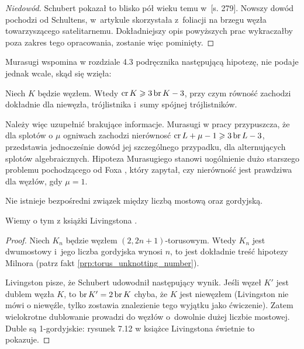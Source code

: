 \begin{proof}[Niedowód]
%
%
    Schubert pokazał to blisko pół wieku temu w~\cite{schubert54}[s. 279].
    Nowszy dowód pochodzi od Schultens, w~artykule \cite{schultens03} skorzystała z~foliacji na brzegu węzła towarzyszącego satelitarnemu.
    Dokładniejszy opis powyższych prac wykraczałby poza zakres tego opracowania, zostanie więc pominięty.
\end{proof}

Murasugi wspomina w rozdziale 4.3 podręcznika \cite{murasugi96} następującą hipotezę, nie podaje jednak wcale, skąd się wzięła:
%

\begin{conjecture}
%
    Niech $K$ będzie węzłem.
    Wtedy $\operatorname{cr} K \geqslant 3 \operatorname{br} K - 3$, przy czym równość zachodzi dokładnie dla niewęzła, trójlistnika i~sumy spójnej trójlistników.
\end{conjecture}

Należy więc uzupełnić brakujące informacje.
Murasugi w pracy \cite{murasugi88} przypuszcza, że dla splotów o $\mu$ ogniwach zachodzi nierównosć $\operatorname{cr} L + \mu - 1 \geqslant 3 \operatorname{br} L - 3$, przedstawia jednocześnie dowód jej szczególnego przypadku, dla alternujących splotów algebraicznych.
%
Hipoteza Murasugiego stanowi uogólnienie dużo starszego problemu pochodzącego od Foxa \cite{fox50}, który zapytał, czy nierówność jest prawdziwa dla węzłów, gdy $\mu = 1$.
%

\begin{proposition}
%
\label{no_relation_bridge_unknotting}%
    Nie istnieje bezpośredni związek między liczbą mostową oraz gordyjską.
\end{proposition}

Wiemy o tym z książki Livingstona \cite[s. 146]{livingston93}.

\begin{proof}
    Niech $K_n$ będzie węzłem $(2, 2n+1)$-torusowym.
    Wtedy $K_n$ jest dwumostowy i~jego liczba gordyjska wynosi $n$, to jest dokładnie treść hipotezy Milnora (patrz fakt \ref{prp:torus_unknotting_number}).

    Livingston pisze, że Schubert udowodnił następujący wynik.
    Jeśli węzeł $K'$ jest dublem węzła $K$, to $\operatorname{br} K' = 2 \operatorname{br} K$ chyba, że $K$ jest niewęzłem (Livingston nie mówi o niewęźle, tylko zostawia znalezienie tego wyjątku jako ćwiczenie).
    Zatem wielokrotne dublowanie prowadzi do węzłów o~dowolnie dużej liczbie mostowej.
    Duble są 1-gordyjskie: rysunek 7.12 w książce Livingstona \cite[s. 146]{livingston93} świetnie to pokazuje.
\end{proof}


%


